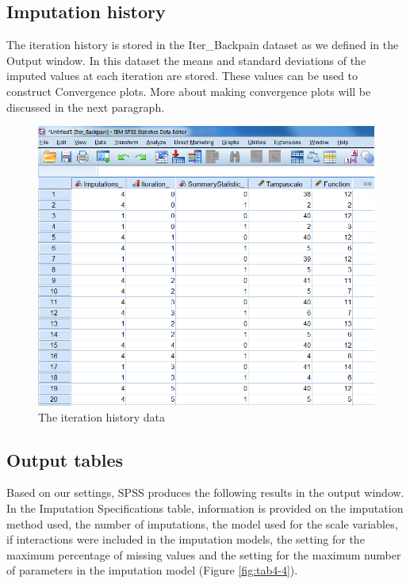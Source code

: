 \documentclass[
]{book}
\begin{document}
\hypertarget{imputation-history}{%
\subsection{Imputation history}\label{imputation-history}}

The iteration history is stored in the Iter\_Backpain dataset as we defined in the Output window. In this dataset the means and standard deviations of the imputed values at each iteration are stored. These values can be used to construct Convergence plots. More about making convergence plots will be discussed in the next paragraph.

\begin{figure}

{\centering \includegraphics[width=0.9\linewidth]{images/fig4.12} 

}

\caption{The iteration history data}\label{fig:fig4-12}
\end{figure}

\hypertarget{output-tables}{%
\subsection{Output tables}\label{output-tables}}

Based on our settings, SPSS produces the following results in the output window. In the Imputation Specifications table, information is provided on the imputation method used, the number of imputations, the model used for the scale variables, if interactions were included in the imputation models, the setting for the maximum percentage of missing values and the setting for the maximum number of parameters in the imputation model (Figure \ref{fig:tab4-4}).
\end{document}
